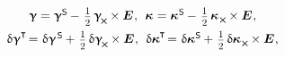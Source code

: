 \nopagebreak\vspace{-0.1em}\begin{equation*}
\begin{array}{c}
\distortiontensor = \distortiontensor^{\mathsf{S}} \hspace{-0.1ex} - \hspace{.25ex} \smalldisplaystyleonehalf \hspace{.32ex} \distortiontensor_{\hspace{-0.25ex}\Xcompanion} \hspace{-0.1ex} \times \UnitDyad
\hspace{.1ex} ,
\:\:
%
\wrynesstensor \hspace{.1ex} = \wrynesstensor^{\hspace{.12ex}\mathsf{S}} \hspace{-0.1ex} - \hspace{.25ex} \smalldisplaystyleonehalf \hspace{.32ex} \wrynesstensor_{\hspace{.15ex}\Xcompanion} \hspace{-0.1ex} \times \UnitDyad
\hspace{.1ex} ,
\\[.6em]
%
\variation{\distortiontensor}^{\T} \hspace{-0.33ex} = \hspace{.1ex} \variation{\distortiontensor}^{\hspace{.2ex}\mathsf{S}} \hspace{-0.1ex} + \hspace{.2ex} \smalldisplaystyleonehalf \hspace{.32ex} \variation{\distortiontensor}_{\hspace{-0.25ex}\Xcompanion} \hspace{-0.1ex} \times \UnitDyad
\hspace{.1ex} ,
\:\:
%
\variation{\wrynesstensor}^{\T} \hspace{-0.33ex} = \hspace{.1ex} \variation{\wrynesstensor}^{\hspace{.12ex}\mathsf{S}} \hspace{-0.1ex} + \hspace{.2ex} \smalldisplaystyleonehalf \hspace{.32ex} \variation{\wrynesstensor}_{\hspace{.15ex}\Xcompanion} \hspace{-0.1ex} \times \UnitDyad
\hspace{.1ex} ,
\\[.6em]

\end{array}
\end{equation*}
